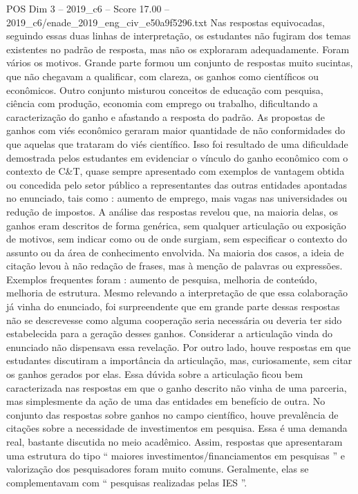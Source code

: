 \begin{textsample}{POS Dim 3 – 2019\_c6 – Score 17.00 – 2019\_c6/enade\_2019\_eng\_civ\_e50a9f5296.txt}
Nas respostas equivocadas, seguindo essas duas linhas de interpretação, os estudantes não fugiram dos temas existentes no padrão de resposta, mas não os exploraram adequadamente.
Foram vários os motivos.
Grande parte formou um conjunto de respostas muito sucintas, que não chegavam a qualificar, com clareza, os ganhos como científicos ou econômicos.
Outro conjunto misturou conceitos de educação com pesquisa, ciência com produção, economia com emprego ou trabalho, dificultando a caracterização do ganho e afastando a resposta do padrão.
As propostas de ganhos com viés econômico geraram maior quantidade de não conformidades do que aquelas que trataram do viés científico.
Isso foi resultado de uma dificuldade demostrada pelos estudantes em evidenciar o vínculo do ganho econômico com o contexto de C\&T, quase sempre apresentado com exemplos de vantagem obtida ou concedida pelo setor público a representantes das outras entidades apontadas no enunciado, tais como : aumento de emprego, mais vagas nas universidades ou redução de impostos.
A análise das respostas revelou que, na maioria delas, os ganhos eram descritos de forma genérica, sem qualquer articulação ou exposição de motivos, sem indicar como ou de onde surgiam, sem especificar o contexto do assunto ou da área de conhecimento envolvida.
Na maioria dos casos, a ideia de citação levou à não redação de frases, mas à menção de palavras ou expressões.
Exemplos frequentes foram : aumento de pesquisa, melhoria de conteúdo, melhoria de estrutura.
Mesmo relevando a interpretação de que essa colaboração já vinha do enunciado, foi surpreendente que em grande parte dessas respostas não se descrevesse como alguma cooperação seria necessária ou deveria ter sido estabelecida para a geração desses ganhos.
Considerar a articulação vinda do enunciado não dispensava essa revelação.
Por outro lado, houve respostas em que estudantes discutiram a importância da articulação, mas, curiosamente, sem citar os ganhos gerados por elas.
Essa dúvida sobre a articulação ficou bem caracterizada nas respostas em que o ganho descrito não vinha de uma parceria, mas simplesmente da ação de uma das entidades em benefício de outra.
No conjunto das respostas sobre ganhos no campo científico, houve prevalência de citações sobre a necessidade de investimentos em pesquisa.
Essa é uma demanda real, bastante discutida no meio acadêmico.
Assim, respostas que apresentaram uma estrutura do tipo “ maiores investimentos/financiamentos em pesquisas ” e valorização dos pesquisadores foram muito comuns.
Geralmente, elas se complementavam com “ pesquisas realizadas pelas IES ”.

\end{textsample}
